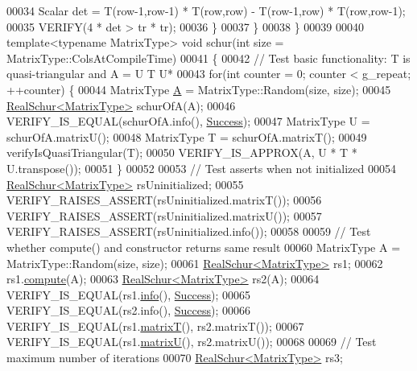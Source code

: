\begin{DoxyCode}
00034       Scalar det = T(row-1,row-1) * T(row,row) - T(row-1,row) * T(row,row-1);
00035       VERIFY(4 * det > tr * tr);
00036     \}
00037   \}
00038 \}
00039 
00040 \textcolor{keyword}{template}<\textcolor{keyword}{typename} MatrixType> \textcolor{keywordtype}{void} schur(\textcolor{keywordtype}{int} size = MatrixType::ColsAtCompileTime)
00041 \{
00042   \textcolor{comment}{// Test basic functionality: T is quasi-triangular and A = U T U*}
00043   \textcolor{keywordflow}{for}(\textcolor{keywordtype}{int} counter = 0; counter < g\_repeat; ++counter) \{
00044     MatrixType \hyperlink{group___core___module_class_eigen_1_1_matrix}{A} = MatrixType::Random(size, size);
00045     \hyperlink{group___eigenvalues___module}{RealSchur<MatrixType>} schurOfA(A);
00046     VERIFY\_IS\_EQUAL(schurOfA.info(), \hyperlink{group__enums_gga85fad7b87587764e5cf6b513a9e0ee5ea52581b035f4b59c203b8ff999ef5fcea}{Success});
00047     MatrixType U = schurOfA.matrixU();
00048     MatrixType T = schurOfA.matrixT();
00049     verifyIsQuasiTriangular(T);
00050     VERIFY\_IS\_APPROX(A, U * T * U.transpose());
00051   \}
00052 
00053   \textcolor{comment}{// Test asserts when not initialized}
00054   \hyperlink{group___eigenvalues___module}{RealSchur<MatrixType>} rsUninitialized;
00055   VERIFY\_RAISES\_ASSERT(rsUninitialized.matrixT());
00056   VERIFY\_RAISES\_ASSERT(rsUninitialized.matrixU());
00057   VERIFY\_RAISES\_ASSERT(rsUninitialized.info());
00058   
00059   \textcolor{comment}{// Test whether compute() and constructor returns same result}
00060   MatrixType A = MatrixType::Random(size, size);
00061   \hyperlink{group___eigenvalues___module}{RealSchur<MatrixType>} rs1;
00062   rs1.\hyperlink{group___eigenvalues___module_a60caf9ffad11d728ea458c4dd36d0a98}{compute}(A);
00063   \hyperlink{group___eigenvalues___module}{RealSchur<MatrixType>} rs2(A);
00064   VERIFY\_IS\_EQUAL(rs1.\hyperlink{group___eigenvalues___module_a386fd2b1a3a8401eca7183ac074deec8}{info}(), \hyperlink{group__enums_gga85fad7b87587764e5cf6b513a9e0ee5ea52581b035f4b59c203b8ff999ef5fcea}{Success});
00065   VERIFY\_IS\_EQUAL(rs2.info(), \hyperlink{group__enums_gga85fad7b87587764e5cf6b513a9e0ee5ea52581b035f4b59c203b8ff999ef5fcea}{Success});
00066   VERIFY\_IS\_EQUAL(rs1.\hyperlink{group___eigenvalues___module_abb78996b43b8642a5f507415730445cb}{matrixT}(), rs2.matrixT());
00067   VERIFY\_IS\_EQUAL(rs1.\hyperlink{group___eigenvalues___module_a85622ccbecff99c8933d21f0a22b22bb}{matrixU}(), rs2.matrixU());
00068 
00069   \textcolor{comment}{// Test maximum number of iterations}
00070   \hyperlink{group___eigenvalues___module}{RealSchur<MatrixType>} rs3;

\end{DoxyCode}
